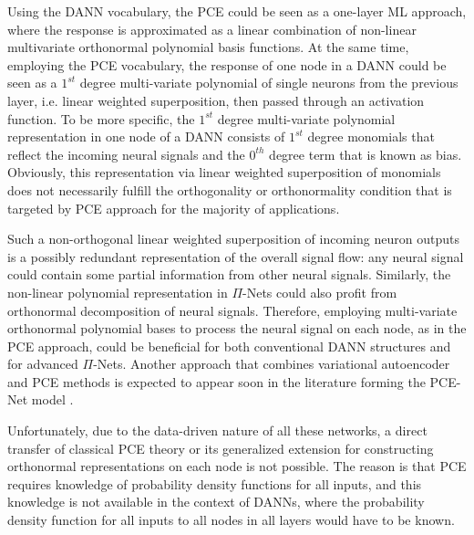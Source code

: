 \documentclass[a4paper,fleqn]{article}
\newcommand{\rw}[1]{\textcolor{blue}{#1}}
\newcommand{\del}[1]{\textcolor{red}{\sout{#1}}}
\renewcommand{\del}[1]{}
\renewcommand{\rw}[1]{#1}
\begin{document}
Using the DANN vocabulary, the PCE could be seen as a one-layer ML approach, where the response is approximated as a linear combination of non-linear \rw{multivariate} orthonormal polynomial basis functions. At the same time, employing the PCE vocabulary, the response of one node in a DANN could be seen as a $1^{st}$ degree multi-variate polynomial of single neurons from the previous layer, i.e. linear weighted superposition, then passed through an activation function. To be more specific, the $1^{st}$ degree multi-variate polynomial representation in one node of a DANN consists of $1^{st}$ degree monomials that reflect the incoming neural signals and the \del{$0^{st}$} \rw{$0^{th}$} degree term that is known as bias. Obviously, this representation via linear weighted superposition of monomials does not necessarily fulfill the orthogonality or orthonormality condition that is targeted by PCE approach for the majority of applications. 

Such a non-orthogonal linear weighted superposition of incoming neuron outputs is a possibly redundant representation of the overall signal flow: any neural signal could contain some partial information from other neural signals. Similarly, the non-linear polynomial representation in $\Pi$-Nets \cite{chrysos2020p} could also profit from orthonormal decomposition of neural signals. Therefore, employing multi-variate orthonormal polynomial bases to process the neural signal on each node, as in the PCE approach, could be beneficial for both conventional DANN structures and for advanced $\Pi$-Nets. 
\rw{Another approach that combines variational autoencoder and PCE methods is expected to appear soon in the literature forming the PCE-Net  model \cite{shustin2022PCENet}.}

Unfortunately, due to the data-driven nature of all these networks, a direct transfer of classical PCE theory or its generalized extension \cite{xiu2002wiener} for constructing orthonormal representations on each node is not possible. The reason is that PCE requires knowledge of probability density functions for all inputs, and this knowledge is not available in the context of DANNs, where the probability density function for all inputs to all nodes in all layers would have to be known. 
\end{document}
